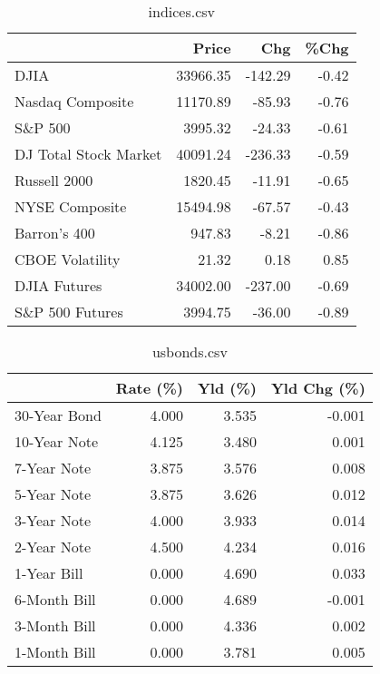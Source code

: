 \documentclass{article}%
\begin{document}
%


\begin{table}[htbp]%
\caption{indices.csv}%
\centering%
\begin{adjustbox}{width=1\textwidth}%
\begin{tabular}{lrrr}
\toprule
                      &    Price &     Chg &  \%Chg \\
\midrule
                 DJIA & 33966.35 & -142.29 & -0.42 \\
     Nasdaq Composite & 11170.89 &  -85.93 & -0.76 \\
              S\&P 500 &  3995.32 &  -24.33 & -0.61 \\
DJ Total Stock Market & 40091.24 & -236.33 & -0.59 \\
         Russell 2000 &  1820.45 &  -11.91 & -0.65 \\
       NYSE Composite & 15494.98 &  -67.57 & -0.43 \\
         Barron's 400 &   947.83 &   -8.21 & -0.86 \\
      CBOE Volatility &    21.32 &    0.18 &  0.85 \\
         DJIA Futures & 34002.00 & -237.00 & -0.69 \\
      S\&P 500 Futures &  3994.75 &  -36.00 & -0.89 \\
\bottomrule
\end{tabular}
%
\end{adjustbox}%
\end{table}

%


\begin{table}[htbp]%
\caption{usbonds.csv}%
\centering%
\begin{adjustbox}{width=1\textwidth}%
\begin{tabular}{lrrr}
\toprule
             &  Rate (\%) &  Yld (\%) &  Yld Chg (\%) \\
\midrule
30-Year Bond &     4.000 &    3.535 &       -0.001 \\
10-Year Note &     4.125 &    3.480 &        0.001 \\
 7-Year Note &     3.875 &    3.576 &        0.008 \\
 5-Year Note &     3.875 &    3.626 &        0.012 \\
 3-Year Note &     4.000 &    3.933 &        0.014 \\
 2-Year Note &     4.500 &    4.234 &        0.016 \\
 1-Year Bill &     0.000 &    4.690 &        0.033 \\
6-Month Bill &     0.000 &    4.689 &       -0.001 \\
3-Month Bill &     0.000 &    4.336 &        0.002 \\
1-Month Bill &     0.000 &    3.781 &        0.005 \\
\bottomrule
\end{tabular}
%
\end{adjustbox}%
\end{table}
\end{document}
